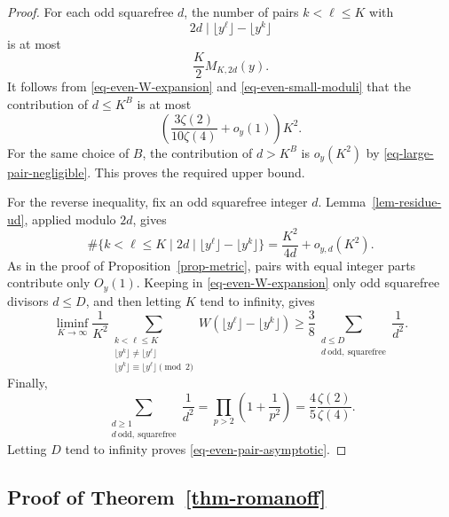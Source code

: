 \documentclass[11pt,reqno]{amsart}
\numberwithin{equation}{section}
\begin{document}
\begin{proof}
        For each odd squarefree $d$, the number of pairs $k<\ell\le K$ with
        $$
        2d\mid \lfloor y^\ell\rfloor-\lfloor y^k\rfloor
        $$
        is at most
        $$
        \frac K2 M_{K,2d}(y).
        $$
        It follows from \eqref{eq-even-W-expansion} and \eqref{eq-even-small-moduli} that the contribution of $d\le K^B$ is at most
        $$
        \left(\frac{3\zeta(2)}{10\zeta(4)}+o_y(1)\right)K^2.
        $$
        For the same choice of $B$, the contribution of $d>K^B$ is $o_y(K^2)$ by \eqref{eq-large-pair-negligible}. This proves the required upper bound.

        For the reverse inequality, fix an odd squarefree integer $d$. Lemma~\ref{lem-residue-ud}, applied modulo $2d$, gives
        $$
        \#\{k<\ell\le K\mid
        2d\mid \lfloor y^\ell\rfloor-\lfloor y^k\rfloor\}
        =\frac{K^2}{4d}+o_{y,d}(K^2).
        $$
        As in the proof of Proposition~\ref{prop-metric}, pairs with equal integer parts contribute only $O_y(1)$. Keeping in \eqref{eq-even-W-expansion} only odd squarefree divisors $d\le D$, and then letting $K$ tend to infinity, gives
        $$
        \liminf_{K\to\infty}\frac1{K^2}
        \sum_{\substack{k<\ell\le K\\
                \lfloor y^k\rfloor\ne\lfloor y^\ell\rfloor\\
                \lfloor y^k\rfloor\equiv\lfloor y^\ell\rfloor\pmod2}}
        W\!\left(\lfloor y^\ell\rfloor-\lfloor y^k\rfloor\right)
        \ge
        \frac38
        \sum_{\substack{d\le D\\d\ \mathrm{odd,\ squarefree}}}\frac1{d^2}.
        $$
        Finally,
        $$
        \sum_{\substack{d\ge1\\d\ \mathrm{odd,\ squarefree}}}\frac1{d^2}
        =\prod_{p>2}\left(1+\frac1{p^2}\right)
        =\frac45\frac{\zeta(2)}{\zeta(4)}.
        $$
        Letting $D$ tend to infinity proves \eqref{eq-even-pair-asymptotic}.
    \end{proof}

    \subsection{Proof of Theorem~\ref{thm-romanoff}}
\end{document}
